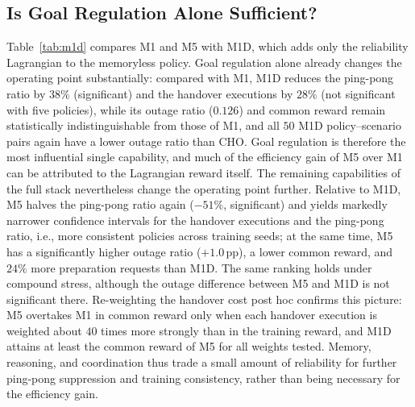 \documentclass[journal]{IEEEtran}
\begin{document}
\subsection{Is Goal Regulation Alone Sufficient?}
Table~\ref{tab:m1d} compares M1 and M5 with M1D, which adds only the
reliability Lagrangian to the memoryless policy. Goal regulation alone already
changes the operating point substantially: compared with M1, M1D reduces the
ping-pong ratio by $38\%$ (significant) and the handover executions by $28\%$
(not significant with five policies), while its outage ratio ($0.126$) and
common reward remain statistically indistinguishable from those of M1, and all
$50$ M1D policy--scenario pairs again have a lower outage ratio than CHO.
Goal regulation is therefore the most influential single capability, and much
of the efficiency gain of M5 over M1 can be attributed to the Lagrangian
reward itself. The remaining capabilities of the full stack nevertheless
change the operating point further. Relative to M1D, M5 halves the ping-pong
ratio again ($-51\%$, significant) and yields markedly narrower confidence
intervals for the handover executions and the ping-pong ratio, i.e., more
consistent policies across training seeds; at the same time, M5 has a
significantly higher outage ratio ($+1.0$\,pp), a lower common reward, and
$24\%$ more preparation requests than M1D. The same ranking holds under
compound stress, although the outage difference between M5 and M1D is not
significant there. Re-weighting the handover cost post hoc confirms this
picture: M5 overtakes M1 in common reward only when each handover execution is
weighted about $40$ times more strongly than in the training reward, and M1D
attains at least the common reward of M5 for all weights tested. Memory,
reasoning, and coordination thus trade a small amount of reliability for
further ping-pong suppression and training consistency, rather than being
necessary for the efficiency gain.
\end{document}
